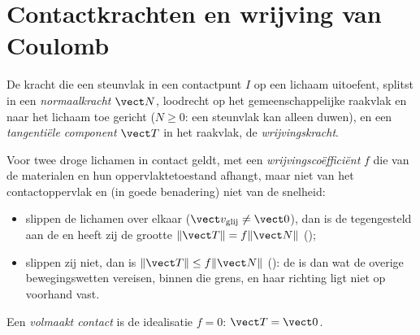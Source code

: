 \section{Contactkrachten en wrijving van Coulomb}

\begin{definition}\label{def:b2:rigid-body-mechanics:contact}
De kracht die een steunvlak in een contactpunt $I$ op een lichaam
uitoefent, splitst in een \emph{normaalkracht} $\vect N$, loodrecht op het
gemeenschappelijke raakvlak en naar het lichaam toe gericht ($N \ge 0$:
een steunvlak kan alleen duwen), en een \emph{tangentiële component}
$\vect T$ in het raakvlak, de \emph{wrijvingskracht}.
\end{definition}

\begin{theorem}\label{thm:b2:rigid-body-mechanics:coulomb}
Voor twee droge lichamen in contact geldt, met een
\emph{wrijvingscoëfficiënt} $f$ die van de materialen en hun
oppervlaktetoestand afhangt, maar niet van het contactoppervlak en (in
goede benadering) niet van de snelheid:
\begin{itemize}
  \item slippen de lichamen over elkaar
        ($\vect v_{\text{glij}} \ne
        \vect 0$), dan is de
         tegengesteld aan de
         en heeft zij de grootte $\|\vect T\| = f\|\vect N\|$
        ();
  \item slippen zij niet, dan is $\|\vect T\| \le f\|\vect N\|$ (): de  is dan wat de overige
        bewegingswetten vereisen, binnen die grens, en haar richting ligt
        niet op voorhand vast.
\end{itemize}
Een \emph{volmaakt contact} is de idealisatie $f = 0$: $\vect T = \vect 0$.
\end{theorem}
\admitted

